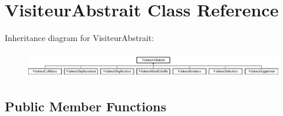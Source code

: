 \hypertarget{class_visiteur_abstrait}{}\section{Visiteur\+Abstrait Class Reference}
\label{class_visiteur_abstrait}
Inheritance diagram for Visiteur\+Abstrait\+:\begin{figure}[H]
\begin{center}
\leavevmode
\includegraphics[height=1.176471cm]{class_visiteur_abstrait}
\end{center}
\end{figure}
\subsection*{Public Member Functions}

